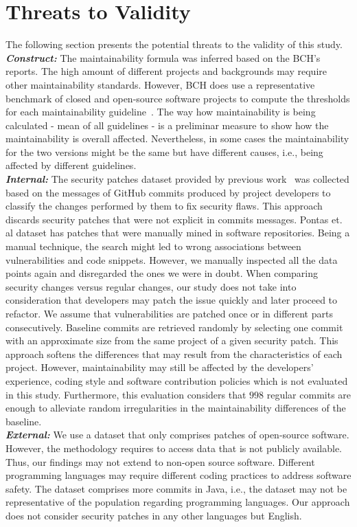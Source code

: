 \documentclass[10pt,conference]{IEEEtran}
\begin{document}
\section{Threats to Validity}\label{sec:threats}
%
The following section presents the potential threats to the validity of this
study.
%
\\\textit{\textbf{Construct:}} The maintainability formula was inferred based 
on the BCH's reports. The high amount of different projects and backgrounds 
may require other maintainability standards. However, BCH does use a 
representative benchmark of closed and open-source software projects to compute 
the thresholds for each maintainability guideline~\cite{Visser:2016:OREILLY, Baggen2012}.
The way how maintainability is being calculated - mean of all guidelines - is
a preliminar measure to show how the maintainability is overall affected. Nevertheless,
in some cases the maintainability for the two versions might be the same but have
different causes, i.e., being affected by different guidelines. 
%
\\\textit{\textbf{Internal:}} The security patches dataset provided by previous
work~\cite{Reis:2017:IJSSE} was collected based on the messages of GitHub
commits produced by project developers to classify the changes performed by them
to fix security flaws. This approach discards security patches that were
not explicit in commits messages. Pontas et. al\cite{10.1109/MSR.2019.00064} dataset
has patches that were manually mined in software repositories. Being a manual technique,
the search might led to wrong associations between vulnerabilities and code snippets. 
However, we manually inspected all the data points again and disregarded the ones we were
in doubt. 
When comparing security changes versus regular changes, our study does not take into consideration that 
developers may patch the issue quickly and later proceed to refactor.
We assume that vulnerabilities are patched once or in different parts consecutively.
Baseline commits are retrieved randomly by selecting one commit with an 
approximate size from the same
project of a given security patch. This approach softens the differences
that may result from the characteristics of each project. However,
maintainability may still be affected by the developers' experience, coding
style and software contribution policies which is not evaluated in this study.
Furthermore, this evaluation considers that $998$ regular commits are enough to
alleviate random irregularities in the maintainability differences of the
baseline. 
%
\\\textit{\textbf{External:}} We use a dataset that only comprises patches of open-source software.
However, the methodology requires to access data that is not publicly available.
Thus, our findings may not extend to non-open source software. Different programming 
languages may require different coding practices to address software safety. The 
dataset comprises more commits in Java, i.e., the dataset may not be representative 
of the population regarding programming languages. Our approach does not consider 
security patches in any other languages but English.
\end{document}
